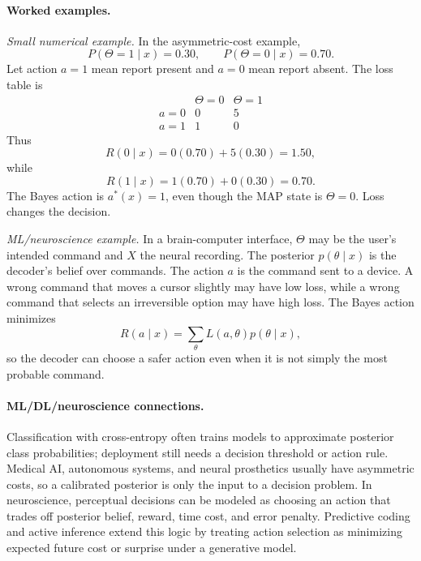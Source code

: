 \paragraph{Worked examples.}
\emph{Small numerical example.} In the asymmetric-cost example,
\[
P(\Theta=1\mid x)=0.30,\qquad P(\Theta=0\mid x)=0.70.
\]
Let action \(a=1\) mean report present and \(a=0\) mean report absent. The loss table is
\[
\begin{array}{c|cc}
& \Theta=0 & \Theta=1\\
\hline
a=0 & 0 & 5\\
a=1 & 1 & 0
\end{array}
\]
Thus
\[
R(0\mid x)=0(0.70)+5(0.30)=1.50,
\]
while
\[
R(1\mid x)=1(0.70)+0(0.30)=0.70.
\]
The Bayes action is \(a^*(x)=1\), even though the MAP state is \(\Theta=0\). Loss changes the decision.

\emph{ML/neuroscience example.} In a brain-computer interface, \(\Theta\) may be the user's intended command and \(X\) the neural recording. The posterior \(p(\theta\mid x)\) is the decoder's belief over commands. The action \(a\) is the command sent to a device. A wrong command that moves a cursor slightly may have low loss, while a wrong command that selects an irreversible option may have high loss. The Bayes action minimizes
\[
R(a\mid x)=\sum_{\theta}L(a,\theta)p(\theta\mid x),
\]
so the decoder can choose a safer action even when it is not simply the most probable command.

\paragraph{ML/DL/neuroscience connections.}
Classification with cross-entropy often trains models to approximate posterior class probabilities; deployment still needs a decision threshold or action rule. Medical AI, autonomous systems, and neural prosthetics usually have asymmetric costs, so a calibrated posterior is only the input to a decision problem. In neuroscience, perceptual decisions can be modeled as choosing an action that trades off posterior belief, reward, time cost, and error penalty. Predictive coding and active inference extend this logic by treating action selection as minimizing expected future cost or surprise under a generative model.

